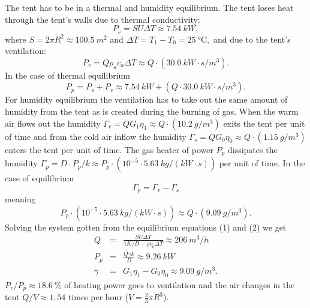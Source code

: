 \documentclass[11pt]{article}
\begin{document}
\solueng
The tent has to be in a thermal and humidity equilibrium. The tent loses heat through the tent’s walls due to thermal conductivity:
\[
P_{s}=SU\Delta T\approx\SI{7.54}{kW},
\]
where $S=2\pi R^{2}\approx\SI{100.5}{m^{2}}$ and $\Delta T=T_{1}-T_{0}=\SI{25}{\degreeCelsius},$ and due to the tent’s ventilation:
\[
P_{v}=Q\rho_{a}c_{a}\Delta T\approx Q\cdot\left(\SI{30.0}{kW\cdot s/m^{3}}\right).
\]
In the case of thermal equilibrium
\begin{equation}
P_{p}=P_{s}+P_{v}\approx\SI{7.54}{kW}+\left(Q\cdot\SI{30.0}{kW\cdot s/m^{3}}\right).\label{eq:2017-v2g-10-gaas-eq1}
\end{equation}
For humidity equilibrium the ventilation has to take out the same amount of humidity from the tent as is created during the burning of gas. When the warm air flows out the humidity $\Gamma_{v}=QG_{1}\eta_{1}\approx Q\cdot\left(\SI{10.2}{g/m^{3}}\right)$ exits the tent per unit of time and from the cold air inflow the humidity $\Gamma_{s}=QG_{0}\eta_{0}\approx Q\cdot\left(\SI{1.15}{g/m^{3}}\right)$ enters the tent per unit of time. The gas heater of power $P_{p}$ dissipates the humidity $\Gamma_{p}=D\cdot P_{p}/k\approx P_{p}\cdot\left(10^{-5}\cdot\SI{5.63}{kg/\left(kW\cdot s\right)}\right)$ per unit of time. In the case of equilibrium
\[
\Gamma_{p}=\Gamma_{v}-\Gamma_{s}
\]
meaning 
\begin{equation}
P_{p}\cdot\left(10^{-5}\cdot\SI{5.63}{kg/\left(kW\cdot s\right)}\right)\approx Q\cdot\left(\SI{9.09}{g/m^{3}}\right).\label{eq:2017-v2g-10-gaas-eq2}
\end{equation}
Solving the system gotten from the equilibrium equations (1) and (2) we get
\begin{eqnarray*}
	Q & = & \frac{SU\Delta T}{\gamma K/D-\rho c_{\tilde{o}}\Delta T}\approx\SI{206}{m^{3}/h}\\
	P_{p} & = & \frac{Q\gamma k}{D}\approx\SI{9.26}{kW}\\
	\gamma & = & G_{1}\eta_{1}-G_{0}\eta_{0}\approx\SI{9.09}{g/m^{3}}.
\end{eqnarray*}
$P_{v}/P_{p}\approx\SI{18.6}{\percent}$ of heating power goes to ventilation and the air changes in the tent $Q/V\approx1,54$ times per hour ($V=\frac{2}{3}\pi R^{3}$).
\probend
\bigskip

\end{document}
